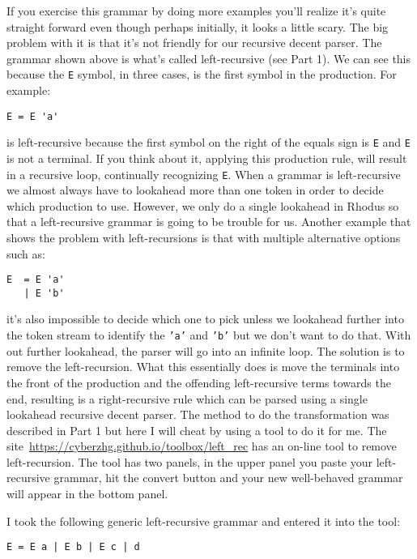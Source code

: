 If you exercise this grammar by doing more examples you'll realize it's quite straight forward even though perhaps initially, it looks a little scary.  The big problem with it is that it's not friendly for our recursive decent parser. The grammar shown above is what's called left-recursive (see Part 1). We can see this because the {\tt E} symbol, in three cases, is the first symbol in the production.  For example:
%
{\footnotesize
\begin{verbatim}
E = E 'a'
\end{verbatim} }
%
is left-recursive because the first symbol on the right of the equals sign is {\tt E} and {\tt E} is not a terminal. If you think about it, applying this production rule, will result in a recursive loop, continually recognizing {\tt E}. When a grammar is left-recursive we almost always have to lookahead more than one token in order to decide which production to use. However, we only do a single lookahead in Rhodus so that a left-recursive grammar is going to be trouble for us. Another example that shows the problem with left-recursions is that with multiple alternative options such as:
%
{\footnotesize
\begin{verbatim}
E  = E 'a'
   | E 'b'
\end{verbatim} }
%
it's also impossible to decide which one to pick unless we lookahead further into the token stream to identify the {\tt 'a'} and {\tt 'b'} but we don't want to do that. With out further lookahead, the parser will go into an infinite loop. The solution is to remove the left-recursion. What this essentially does is move the terminals into the front of the production and the offending left-recursive terms towards the end, resulting is a right-recursive rule which can be parsed using a single lookahead recursive decent parser. The method to do the transformation was described in Part 1 but here I will cheat by using a tool to do it for me. The site~\url{https://cyberzhg.github.io/toolbox/left_rec} has an on-line tool to remove left-recursion. The tool has two panels, in the upper panel you paste your left-recursive grammar, hit the convert button and your new well-behaved grammar will appear in the bottom panel.

I took the following generic left-recursive grammar and entered it into the tool:

{\tt  E = E a | E b | E c | d}

